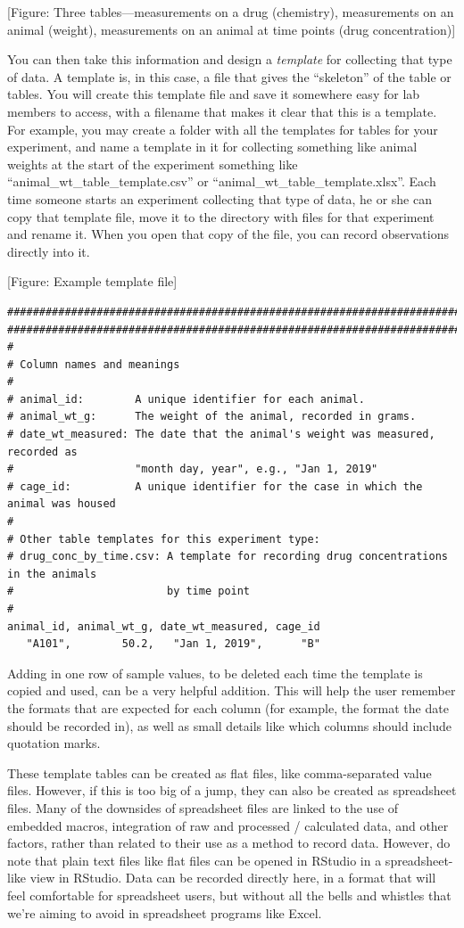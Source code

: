 \documentclass[]{tufte-book}
\begin{document}
{[}Figure: Three tables---measurements on a drug (chemistry), measurements on an animal (weight),
measurements on an animal at time points (drug concentration){]}

You can then take this information and design a \emph{template} for collecting that
type of data. A template is, in this case, a file that gives the ``skeleton'' of
the table or tables. You will create this template file and save it somewhere
easy for lab members to access, with a filename that makes it clear that this is
a template. For example, you may create a folder with all the templates for
tables for your experiment, and name a template in it for collecting something
like animal weights at the start of the experiment something like
``animal\_wt\_table\_template.csv'' or ``animal\_wt\_table\_template.xlsx''.
Each time someone starts an experiment collecting that type of data, he or she
can copy that template file, move it to the directory with files for that
experiment and rename it. When you open that copy of the file, you can record
observations directly into it.

{[}Figure: Example template file{]}

\begin{verbatim}
####################################################################################
####################################################################################
#
# Column names and meanings
#
# animal_id:        A unique identifier for each animal. 
# animal_wt_g:      The weight of the animal, recorded in grams. 
# date_wt_measured: The date that the animal's weight was measured, recorded as 
#                   "month day, year", e.g., "Jan 1, 2019"
# cage_id:          A unique identifier for the case in which the animal was housed
# 
# Other table templates for this experiment type: 
# drug_conc_by_time.csv: A template for recording drug concentrations in the animals
#                        by time point
# 
animal_id, animal_wt_g, date_wt_measured, cage_id
   "A101",        50.2,   "Jan 1, 2019",      "B"    
\end{verbatim}

Adding in one row of sample values, to be deleted each time the template is
copied and used, can be a very helpful addition. This will help the user remember
the formats that are expected for each column (for example, the format the
date should be recorded in), as well as small details like which columns should
include quotation marks.

These template tables can be created as flat files, like comma-separated value
files. However, if this is too big of a jump, they can also be created as
spreadsheet files. Many of the downsides of spreadsheet files are linked to
the use of embedded macros, integration of raw and processed / calculated data,
and other factors, rather than related to their use as a method to record data.
However, do note that plain text files like flat files can be opened in RStudio
in a spreadsheet-like view in RStudio. Data can be recorded directly here, in
a format that will feel comfortable for spreadsheet users, but without all the
bells and whistles that we're aiming to avoid in spreadsheet programs like Excel.
\end{document}
